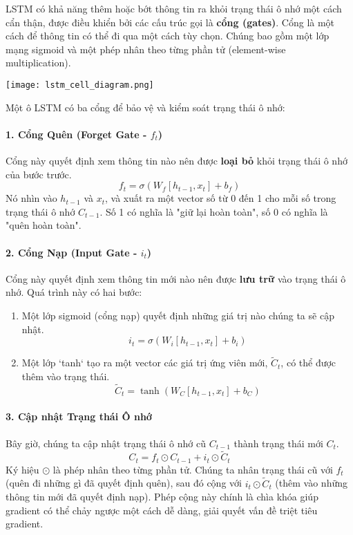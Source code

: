 LSTM có khả năng thêm hoặc bớt thông tin ra khỏi trạng thái ô nhớ một cách cẩn thận, được điều khiển bởi các cấu trúc gọi là \textbf{cổng (gates)}. Cổng là một cách để thông tin có thể đi qua một cách tùy chọn. Chúng bao gồm một lớp mạng sigmoid và một phép nhân theo từng phần tử (element-wise multiplication).

\begin{center}
    \texttt{[image: lstm\_cell\_diagram.png]}
    \label{fig:lstm_cell_diagram}
\end{center}

Một ô LSTM có ba cổng để bảo vệ và kiểm soát trạng thái ô nhớ:

\paragraph{1. Cổng Quên (Forget Gate - $f_t$)}
Cổng này quyết định xem thông tin nào nên được \textbf{loại bỏ} khỏi trạng thái ô nhớ của bước trước.
$$ f_t = \sigma(W_f [h_{t-1}, x_t] + b_f) $$
Nó nhìn vào $h_{t-1}$ và $x_t$, và xuất ra một vector số từ 0 đến 1 cho mỗi số trong trạng thái ô nhớ $C_{t-1}$. Số 1 có nghĩa là "giữ lại hoàn toàn", số 0 có nghĩa là "quên hoàn toàn".

\paragraph{2. Cổng Nạp (Input Gate - $i_t$)}
Cổng này quyết định xem thông tin mới nào nên được \textbf{lưu trữ} vào trạng thái ô nhớ. Quá trình này có hai bước:
\begin{enumerate}
    \item Một lớp sigmoid (cổng nạp) quyết định những giá trị nào chúng ta sẽ cập nhật.
        $$ i_t = \sigma(W_i [h_{t-1}, x_t] + b_i) $$
    \item Một lớp `tanh` tạo ra một vector các giá trị ứng viên mới, $\tilde{C}_t$, có thể được thêm vào trạng thái.
        $$ \tilde{C}_t = \tanh(W_C [h_{t-1}, x_t] + b_C) $$
\end{enumerate}

\paragraph{3. Cập nhật Trạng thái Ô nhớ}
Bây giờ, chúng ta cập nhật trạng thái ô nhớ cũ $C_{t-1}$ thành trạng thái mới $C_t$.
$$ C_t = f_t \odot C_{t-1} + i_t \odot \tilde{C}_t $$
Ký hiệu $\odot$ là phép nhân theo từng phần tử. Chúng ta nhân trạng thái cũ với $f_t$ (quên đi những gì đã quyết định quên), sau đó cộng với $i_t \odot \tilde{C}_t$ (thêm vào những thông tin mới đã quyết định nạp). Phép cộng này chính là chìa khóa giúp gradient có thể chảy ngược một cách dễ dàng, giải quyết vấn đề triệt tiêu gradient.

